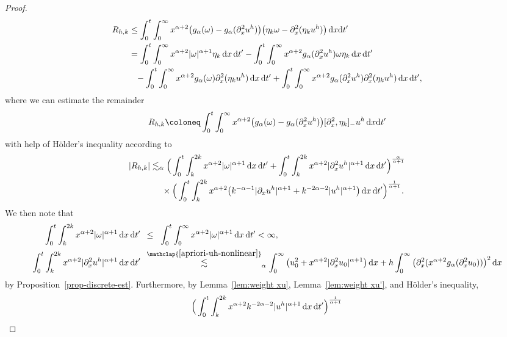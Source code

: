 \documentclass[reqno,12pt]{amsart}
\renewcommand{\d}{\ensuremath{\mathrm{d}}}
\renewcommand{\d}{\ensuremath{{\rm d}}}
\numberwithin{equation}{section}
\begin{document}
\begin{proof}
%
\begin{align*}
R_{h,k} &\le \int_0^t \int_0^\infty x^{\alpha+2} \big(g_\alpha(\omega) - g_\alpha(\partial_x^2 u^h)\big) \big(\eta_k \omega - \partial_x^2 (\eta_k u^h)\big) \, \d x \d t' \\
&= \int_0^t \int_0^\infty x^{\alpha+2} |\omega|^{\alpha+1} \eta_k \, \d x \, \d t' - \int_0^t \int_0^\infty x^{\alpha+2} g_\alpha(\partial_x^2 u^h) \omega \eta_k \, \d x \, \d t' \\
& \phantom{=} - \int_0^t \int_0^\infty x^{\alpha+2} g_\alpha(\omega) \partial_x^2 (\eta_k u^h) \, \d x \, \d t' + \int_0^t \int_0^\infty x^{\alpha+2} g_\alpha(\partial_x^2 u^h) \partial_x^2 (\eta_k u^h) \, \d x \, \d t',
\end{align*}
%
where we can estimate the remainder
%
\[
R_{h,k} \coloneq \int_0^t \int_0^\infty x^{\alpha+2} \big(g_\alpha(\omega) - g_\alpha(\partial_x^2 u^h)\big) [\partial_x^2,\eta_k]_- u^h \, \d x \d t'
\]
%
with help of H\"older's inequality according to
%
\begin{align*}
|R_{h,k}| &\lesssim_\alpha \Big(\int_0^t \int_k^{2k} x^{\alpha+2} |\omega|^{\alpha+1} \, \d x \, \d t' + \int_0^t \int_k^{2k} x^{\alpha+2} |\partial_x^2 u^h|^{\alpha+1} \, \d x \, \d t'\Big)^{\frac{\alpha}{\alpha+1}} \\
&\phantom{\lesssim_\alpha} \times \Big(\int_0^t \int_k^{2k} x^{\alpha+2} \big(k^{-\alpha-1} |\partial_x u^h|^{\alpha+1} + k^{-2\alpha-2} |u^h|^{\alpha+1}\big) \, \d x \, \d t'\Big)^{\frac{1}{\alpha+1}}.
\end{align*}
%
We then note that
%
\begin{align*}
\int_0^t \int_k^{2k} x^{\alpha+2} |\omega|^{\alpha+1} \, \d x \, \d t' \;\, &\le_{\phantom{\alpha}} \int_0^t \int_0^\infty x^{\alpha+2} |\omega|^{\alpha+1} \, \d x \, \d t' < \infty, \\
\int_0^t \int_k^{2k} x^{\alpha+2} |\partial_x^2 u^h|^{\alpha+1} \, \d x \, \d t' \;\, &\stackrel{\mathclap{\eqref{apriori-uh-nonlinear}}}{\lesssim}_\alpha \int_0^\infty \big(u_0^2 + x^{\alpha+2} |\partial_x^2 u_0|^{\alpha+1}\big) \, \d x + h \int_0^\infty \big(\partial_x^2 (x^{\alpha+2} g_\alpha(\partial_x^2 u_0))\big)^2 \, \d x
\end{align*}
%
by Proposition~\ref{prop-discrete-est}. Furthermore, by Lemma~\ref{lem:weight xu}, Lemma~\ref{lem:weight xu'}, and H\"older's inequality,
\begin{align*}
& \Big(\int_0^t \int_k^{2k} x^{\alpha+2} k^{-2\alpha-2} |u^h|^{\alpha+1} \, \d x \, \d t'\Big)^{\frac{1}{\alpha+1}} \\

\end{align*}
\end{proof}
\end{document}
